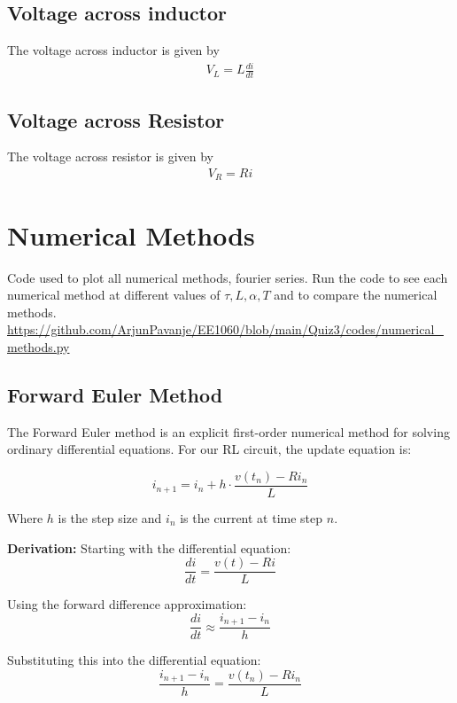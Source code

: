 \documentclass[12pt,a4paper]{report}
\begin{document}
\section{Voltage across inductor}
The voltage across inductor is given by
\begin{align}
    V_L=L\frac{di}{dt}
\end{align}
\section{Voltage across Resistor}
The voltage across resistor is given by
\begin{align}
    V_R=Ri
\end{align}
\chapter{Numerical Methods}
Code used to plot all numerical methods, fourier series. Run the code to see each numerical method at different values of $\tau, L, \alpha, T$ and to compare the numerical methods. \url{https://github.com/ArjunPavanje/EE1060/blob/main/Quiz3/codes/numerical_methods.py}
\section{Forward Euler Method}
The Forward Euler method is an explicit first-order numerical method for solving ordinary differential equations. For our RL circuit, the update equation is:

\begin{equation}
i_{n+1} = i_n + h \cdot \frac{v(t_n) - Ri_n}{L}
\end{equation}

Where $h$ is the step size and $i_n$ is the current at time step $n$.

\textbf{Derivation:}
Starting with the differential equation:
\begin{equation}
\frac{di}{dt} = \frac{v(t) - Ri}{L}
\end{equation}

Using the forward difference approximation:
\begin{equation}
\frac{di}{dt} \approx \frac{i_{n+1} - i_n}{h}
\end{equation}

Substituting this into the differential equation:
\begin{equation}
\frac{i_{n+1} - i_n}{h} = \frac{v(t_n) - Ri_n}{L}
\end{equation}
\end{document}
